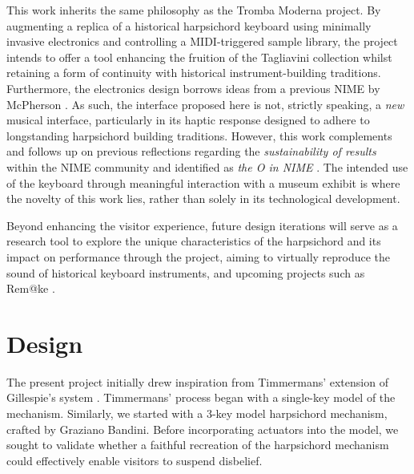 This work inherits the same philosophy as the Tromba Moderna project. By augmenting a replica of a historical harpsichord keyboard using minimally invasive electronics and controlling a MIDI-triggered sample library, the project intends to offer a tool enhancing the fruition of the Tagliavini collection whilst retaining a form of continuity with historical instrument-building traditions. Furthermore, the electronics design borrows ideas from a previous NIME by McPherson \cite{McPherson2013}. As such, the interface proposed here is not, strictly speaking, a \emph{new} musical interface, particularly in its haptic response designed to adhere to longstanding harpsichord building traditions. However, this work complements and follows up on previous reflections regarding the \emph{sustainability of results} within the NIME community and identified as \emph{the O in NIME} \cite{Masu_NIME_2023}. The intended use of the keyboard through meaningful interaction with a museum exhibit is where the novelty of this work lies, rather than solely in its technological development. 

Beyond enhancing the visitor experience, future design iterations will serve as a research tool to explore the unique characteristics of the harpsichord and its impact on performance through the  project, aiming to virtually reproduce the sound of historical keyboard instruments, and upcoming projects such as Rem@ke \cite{remake1}.

\section{Design}\label{design}

The present project initially drew inspiration from Timmermans' extension of Gillespie’s system \cite{Timmermans2020, Gillespie1996}. Timmermans’ process began with a single-key model of the mechanism. Similarly, we started with a 3-key model harpsichord mechanism, crafted by Graziano Bandini. Before incorporating actuators into the model, we sought to validate whether a faithful recreation of the harpsichord mechanism could effectively enable visitors to suspend disbelief.

